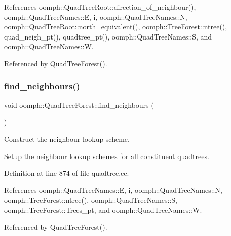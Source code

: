 References oomph\+::\+Quad\+Tree\+Root\+::direction\+\_\+of\+\_\+neighbour(), oomph\+::\+Quad\+Tree\+Names\+::E, i, oomph\+::\+Quad\+Tree\+Names\+::N, oomph\+::\+Quad\+Tree\+Root\+::north\+\_\+equivalent(), oomph\+::\+Tree\+Forest\+::ntree(), quad\+\_\+neigh\+\_\+pt(), quadtree\+\_\+pt(), oomph\+::\+Quad\+Tree\+Names\+::S, and oomph\+::\+Quad\+Tree\+Names\+::W.



Referenced by Quad\+Tree\+Forest().

\mbox{\label{classoomph_1_1QuadTreeForest_a835592b97a235b8dd31ea54d440b02c9}} 
\subsubsection{\texorpdfstring{find\+\_\+neighbours()}{find\_neighbours()}}
{\footnotesize\ttfamily void oomph\+::\+Quad\+Tree\+Forest\+::find\+\_\+neighbours (\begin{DoxyParamCaption}{ }\end{DoxyParamCaption})\hspace{0.3cm}{\ttfamily [private]}}



Construct the neighbour lookup scheme. 

Setup the neighbour lookup schemes for all constituent quadtrees. 

Definition at line 874 of file quadtree.\+cc.



References oomph\+::\+Quad\+Tree\+Names\+::E, i, oomph\+::\+Quad\+Tree\+Names\+::N, oomph\+::\+Tree\+Forest\+::ntree(), oomph\+::\+Quad\+Tree\+Names\+::S, oomph\+::\+Tree\+Forest\+::\+Trees\+\_\+pt, and oomph\+::\+Quad\+Tree\+Names\+::W.



Referenced by Quad\+Tree\+Forest().

\mbox{\label{classoomph_1_1QuadTreeForest_a42c02805b4a2307def88d07e5a7c8266}} 
